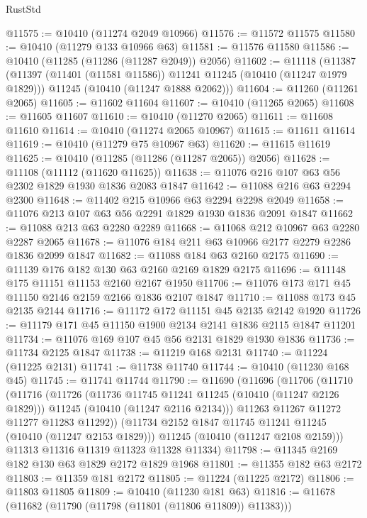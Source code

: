 \begin{lexlean}{RustStd}
\begin{coremodule}
@11575 := @10410 (@11274 @2049 @10966)
@11576 := @11572 @11575
@11580 := @10410 (@11279 @133 @10966 @63)
@11581 := @11576 @11580
@11586 := @10410 (@11285 (@11286 (@11287 @2049)) @2056)
@11602 := @11118
    (@11387
      (@11397 (@11401 (@11581 @11586)) @11241 @11245 (@10410 (@11247 @1979 @1829)))
      @11245
      (@10410 (@11247 @1888 @2062)))
@11604 := @11260 (@11261 @2065)
@11605 := @11602 @11604
@11607 := @10410 (@11265 @2065)
@11608 := @11605 @11607
@11610 := @10410 (@11270 @2065)
@11611 := @11608 @11610
@11614 := @10410 (@11274 @2065 @10967)
@11615 := @11611 @11614
@11619 := @10410 (@11279 @75 @10967 @63)
@11620 := @11615 @11619
@11625 := @10410 (@11285 (@11286 (@11287 @2065)) @2056)
@11628 := @11108 (@11112 (@11620 @11625))
@11638 := @11076 @216 @107 @63 @56 @2302 @1829 @1930 @1836 @2083 @1847
@11642 := @11088 @216 @63 @2294 @2300
@11648 := @11402 @215 @10966 @63 @2294 @2298 @2049
@11658 := @11076 @213 @107 @63 @56 @2291 @1829 @1930 @1836 @2091 @1847
@11662 := @11088 @213 @63 @2280 @2289
@11668 := @11068 @212 @10967 @63 @2280 @2287 @2065
@11678 := @11076 @184 @211 @63 @10966 @2177 @2279 @2286 @1836 @2099 @1847
@11682 := @11088 @184 @63 @2160 @2175
@11690 := @11139 @176 @182 @130 @63 @2160 @2169 @1829 @2175
@11696 := @11148 @175 @11151 @11153 @2160 @2167 @1950
@11706 := @11076 @173 @171 @45 @11150 @2146 @2159 @2166 @1836 @2107 @1847
@11710 := @11088 @173 @45 @2135 @2144
@11716 := @11172 @172 @11151 @45 @2135 @2142 @1920
@11726 := @11179 @171 @45 @11150 @1900 @2134 @2141 @1836 @2115 @1847 @11201
@11734 := @11076 @169 @107 @45 @56 @2131 @1829 @1930 @1836
@11736 := @11734 @2125 @1847
@11738 := @11219 @168 @2131
@11740 := @11224 (@11225 @2131)
@11741 := @11738 @11740
@11744 := @10410 (@11230 @168 @45)
@11745 := @11741 @11744
@11790 := @11690
    (@11696
      (@11706
        (@11710
          (@11716
            (@11726
              (@11736 @11745 @11241 @11245 (@10410 (@11247 @2126 @1829)))
              @11245
              (@10410 (@11247 @2116 @2134)))
            @11263
            @11267
            @11272
            @11277
            @11283
            @11292))
        (@11734 @2152 @1847 @11745 @11241 @11245 (@10410 (@11247 @2153 @1829)))
        @11245
        (@10410 (@11247 @2108 @2159)))
      @11313
      @11316
      @11319
      @11323
      @11328
      @11334)
@11798 := @11345 @2169 @182 @130 @63 @1829 @2172 @1829 @1968
@11801 := @11355 @182 @63 @2172
@11803 := @11359 @181 @2172
@11805 := @11224 (@11225 @2172)
@11806 := @11803 @11805
@11809 := @10410 (@11230 @181 @63)
@11816 := @11678 (@11682 (@11790 (@11798 (@11801 (@11806 @11809)) @11383)))

\end{coremodule}
\end{lexlean}
